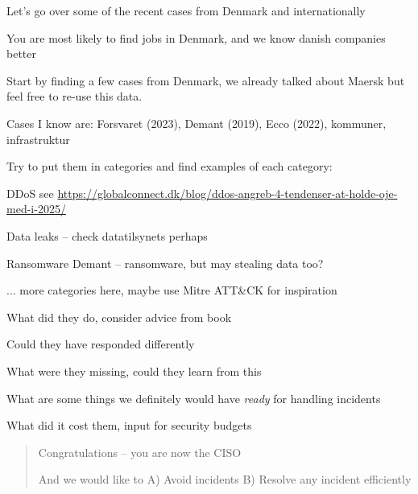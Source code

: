\documentclass[Screen16to9,17pt]{foils}
\begin{document}


Let's go over some of the recent cases from Denmark and internationally

You are most likely to find jobs in Denmark, and we know danish companies better


Start by finding a few cases from Denmark, we already talked about Maersk but feel free to re-use this data.

Cases I know are: Forsvaret (2023), Demant (2019), Ecco (2022), kommuner, infrastruktur

Try to put them in categories and find examples of each category:
\begin{list2}
\item DDoS see \url{https://globalconnect.dk/blog/ddos-angreb-4-tendenser-at-holde-oje-med-i-2025/}
\item Data leaks -- check datatilsynets perhaps
\item Ransomware Demant -- ransomware, but may stealing data too?
\item ... more categories here, maybe use Mitre ATT\&CK for inspiration
\end{list2}



\begin{list2}
\item What did they do, consider advice from book
\item Could they have responded differently
\item What were they missing, could they learn from this
\item What are some things we definitely would have \emph{ready} for handling incidents
\item What did it cost them, input for security budgets
\end{list2}




\begin{quote}
Congratulations -- you are now the CISO

And we would like to A) Avoid incidents B) Resolve any incident efficiently
\end{quote}
\end{document}
